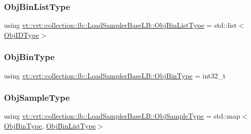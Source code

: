 \subsubsection{\texorpdfstring{Obj\+Bin\+List\+Type}{ObjBinListType}}
{\footnotesize\ttfamily using \hyperlink{structvt_1_1vrt_1_1collection_1_1lb_1_1_load_sampler_base_l_b_a58de8f1e1204cf52b661b3906e2d9eeb}{vt\+::vrt\+::collection\+::lb\+::\+Load\+Sampler\+Base\+L\+B\+::\+Obj\+Bin\+List\+Type} =  std\+::list$<$\hyperlink{structvt_1_1vrt_1_1collection_1_1lb_1_1_base_l_b_a790b22acf448880599724749cdc4e9b3}{Obj\+I\+D\+Type}$>$}

\mbox{\label{structvt_1_1vrt_1_1collection_1_1lb_1_1_load_sampler_base_l_b_acb55af31b27a3c248d351189abd78487}} 
\subsubsection{\texorpdfstring{Obj\+Bin\+Type}{ObjBinType}}
{\footnotesize\ttfamily using \hyperlink{structvt_1_1vrt_1_1collection_1_1lb_1_1_load_sampler_base_l_b_acb55af31b27a3c248d351189abd78487}{vt\+::vrt\+::collection\+::lb\+::\+Load\+Sampler\+Base\+L\+B\+::\+Obj\+Bin\+Type} =  int32\+\_\+t}

\mbox{\label{structvt_1_1vrt_1_1collection_1_1lb_1_1_load_sampler_base_l_b_a8d939a849ec0d6371c1c4d441ffb9b94}} 
\subsubsection{\texorpdfstring{Obj\+Sample\+Type}{ObjSampleType}}
{\footnotesize\ttfamily using \hyperlink{structvt_1_1vrt_1_1collection_1_1lb_1_1_load_sampler_base_l_b_a8d939a849ec0d6371c1c4d441ffb9b94}{vt\+::vrt\+::collection\+::lb\+::\+Load\+Sampler\+Base\+L\+B\+::\+Obj\+Sample\+Type} =  std\+::map$<$\hyperlink{structvt_1_1vrt_1_1collection_1_1lb_1_1_load_sampler_base_l_b_acb55af31b27a3c248d351189abd78487}{Obj\+Bin\+Type}, \hyperlink{structvt_1_1vrt_1_1collection_1_1lb_1_1_load_sampler_base_l_b_a58de8f1e1204cf52b661b3906e2d9eeb}{Obj\+Bin\+List\+Type}$>$}



